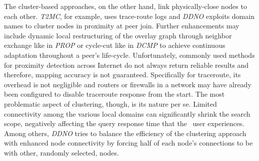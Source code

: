 The cluster-based approaches, on the other hand, 
link physically-close nodes to each other. 
\emph{T2MC}, for example, uses trace-route logs and 
\emph{DDNO} exploits domain names to cluster nodes in proximity at peer join.
Further enhancements may include dynamic local restructuring of the overlay
graph through neighbor exchange like in \emph{PROP} or cycle-cut like in
\emph{DCMP} to achieve continuous adaptation throughout a peer's life-cycle.
Unfortunately, commonly used methods for proximity detection across Internet do
not always return
reliable results and therefore, mapping accuracy is not guaranteed. Specifically
for traceroute, its overhead is not negligible and routers or firewalls in a
network may have already been configured to disable traceroute response from
the start. 
The most problematic aspect of clustering, though, is
its nature per se. 
Limited connectivity among the various local domains can
significantly shrink the search scope, negatively affecting the query response
time that the \p\ user experiences. 
Among others, \emph{DDNO} tries to 
balance the efficiency of the clustering approach 
with enhanced node connectivity by forcing half of each node's connections to be
with other, randomly selected, nodes.

